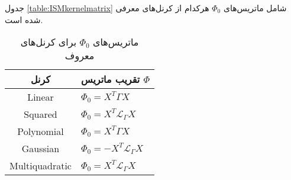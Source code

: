 جدول 
\eqref{table:ISMkernelmatrix}
شامل ماتریس‌های
$\Phi_0$
هرکدام از کرنل‌های معرفی شده‌ است.

\begin{table}[h!] 
	\centering 
	\begin{tabular}{c|l}
		کرنل & تقریب ماتریس 
		$\Phi$
		\\
		\midrule
		Linear
		& $\Phi_0=X^T\Gamma X$ \\
		Squared
		& $\Phi_0=X^T \mathcal{L}_{\Gamma} X$ \\  
		Polynomial
		& $\Phi_0=X^T \Gamma X$\\
		Gaussian
		& $\Phi_0=-X^T \mathcal{L}_{\Gamma} X$\\
		Multiquadratic
		& $\Phi_0=X^T\mathcal{L}_{\Gamma} X$\\
		\bottomrule       
	\end{tabular}
	\caption{ ماتریس‌های 
		$\Phi_0$	
		برای کرنل‌های معروف
	}
	\label{table:ISMkernelmatrix}
\end{table}



